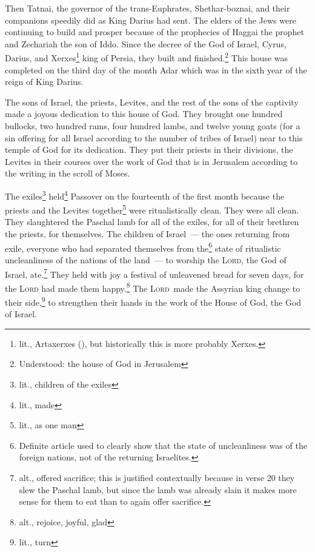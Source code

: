 \begin{inparaenum}\setcounter{enumi}{12}
     Then Tatnai, the governor of the trans-Euphrates, Shethar-boznai, and their companions speedily did as King Darius had sent.%
     The elders of the Jews were continuing to build and prosper because of the prophecies of Haggai the prophet and Zechariah the son of Iddo. Since the decree of the God of Israel, Cyrus, Darius, and Xerxes\footnote{lit., Artaxerxes (), but historically this is more probably Xerxes.} king of Persia, they built and finished.\footnote{Understood: the house of God in Jerusalem}%
     This house was completed on the third day of the month Adar which was in the sixth year of the reign of King Darius.%
    
     The sons of Israel, the priests, Levites, and the rest of the sons of the captivity made a joyous dedication to this house of God.%
     They brought one hundred bullocks, two hundred rams, four hundred lambs, and twelve young goats (for a sin offering for all Israel according to the number of tribes of Israel) near to this temple of God for its dedication.%
     They put their priests in their divisions, the Levites in their courses over the work of God that is in Jerusalem according to the writing in the scroll of Moses.%
    
     The exiles\footnote{lit., children of the exiles} held\footnote{lit., made} Passover on the fourteenth of the first month%
     because the priests and the Levites together\footnote{lit., as one man} were ritualistically clean. They were all clean. They slaughtered the Paschal lamb for all of the exiles, for all of their brethren the priests, for themselves.%
     The children of Israel~--- the ones returning from exile, everyone who had separated themselves from the\footnote{Definite article used to clearly show that the state of uncleanliness was of the foreign nations, not of the returning Israelites.} state of ritualistic uncleanliness of the nations of the land~--- to worship the \textsc{Lord}, the God of Israel, ate.\footnote{alt., offered sacrifice; this is justified contextually because in verse 20 they slew the Paschal lamb, but since the lamb was already slain it makes more sense for them to eat than to again offer sacrifice.}%
     They held with joy a festival of unleavened bread for seven days, for the \textsc{Lord} had made them happy.\footnote{alt., rejoice, joyful, glad} The \textsc{Lord}\understood\ made the Assyrian king change to their side,\footnote{lit., turn} to strengthen their hands in the work of the House of God, the God of Israel.%
\end{inparaenum}
